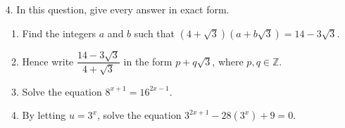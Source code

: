 \documentclass[12pt, twoside]{article}
\begin{document}
\begin{enumerate}[itemsep=0.15cm]
\begin{enumerate}[itemsep=0.1cm]
  \item Write down three equations in $x$, $y$ and $z$.
  \item Find the price of each size of smoothie.
  \item On Wednesday the caf\'e sold $15$ small and $10$ large smoothies,
  and some medium smoothies, for a total of $153.30$ euros. Find the
  number of medium smoothies sold on Wednesday.
\end{enumerate}


\newpage

\item[4.]
In this question, give every answer in exact form.

\begin{enumerate}[itemsep=0.1cm]
  \item Find the integers $a$ and $b$ such that
  $\left(4 + \sqrt{3}\right)\left(a + b\sqrt{3}\right) = 14 - 3\sqrt{3}$.
  \item Hence write $\dfrac{14 - 3\sqrt{3}}{4 + \sqrt{3}}$ in the form
  $p + q\sqrt{3}$, where $p, q \in \mathbb{Z}$.
  \item Solve the equation $8^{x + 1} = 16^{2x - 1}$.
  \item By letting $u = 3^{x}$, solve the equation
  $3^{2x + 1} - 28\left(3^{x}\right) + 9 = 0$.
\end{enumerate}


\end{enumerate}
\end{document}

